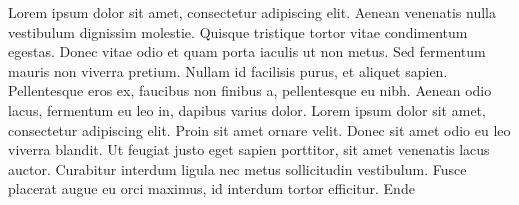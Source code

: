 Lorem ipsum dolor sit amet, consectetur adipiscing elit. Aenean venenatis nulla vestibulum dignissim molestie. Quisque tristique tortor vitae condimentum egestas. Donec vitae odio et quam porta iaculis ut non metus. Sed fermentum mauris non viverra pretium. Nullam id facilisis purus, et aliquet sapien. Pellentesque eros ex, faucibus non finibus a, pellentesque eu nibh. Aenean odio lacus, fermentum eu leo in, dapibus varius dolor. Lorem ipsum dolor sit amet, consectetur adipiscing elit. Proin sit amet ornare velit. Donec sit amet odio eu leo viverra blandit. Ut feugiat justo eget sapien porttitor, sit amet venenatis lacus auctor. Curabitur interdum ligula nec metus sollicitudin vestibulum. Fusce placerat augue eu orci maximus, id interdum tortor efficitur. Ende